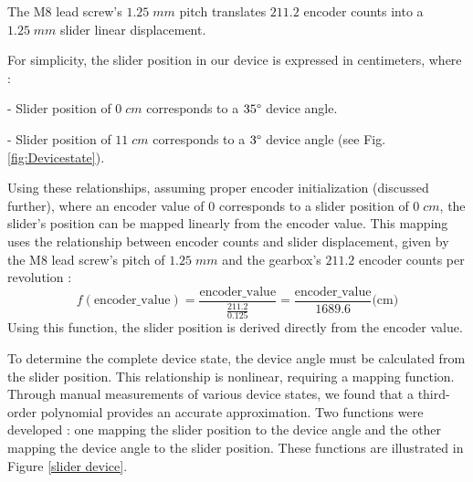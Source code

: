 \documentclass[lettersize,journal]{IEEEtran}
\begin{document}
The M8 lead screw’s $1.25 \;mm$ pitch translates $211.2$ encoder counts into a $1.25 \;mm$ slider linear displacement.

For simplicity, the slider position in our device is expressed in centimeters, where :

\noindent - Slider position of $0\; cm$ corresponds to a $35\degree$ device angle.

\noindent - Slider position of $11 \;cm$ corresponds to a $3\degree$ device angle (see Fig. \ref{fig:Devicestate}).

Using these relationships, assuming proper encoder initialization (discussed further), where an encoder value of $0$ corresponds to a slider position of $0 \;cm$, the slider’s position can be mapped linearly from the encoder value. This mapping uses the relationship between encoder counts and slider displacement, given by the M8 lead screw’s pitch of $1.25 \;mm$ and the gearbox’s $211.2$ encoder counts per revolution :
\[
f(\text{encoder\_value}) = \frac{\text{encoder\_value}}{\frac{211.2}{0.125}} = \frac{\text{encoder\_value}}{1689.6} \text{(cm)}
\]
Using this function, the slider position is derived directly from the encoder value.

To determine the complete device state, the device angle must be calculated from the slider position. This relationship is nonlinear, requiring a mapping function. Through manual measurements of various device states, we found that a third-order polynomial provides an accurate approximation. Two functions were developed : one mapping the slider position to the device angle and the other mapping the device angle to the slider position. These functions are illustrated in Figure \ref{slider device}.






\end{document}
